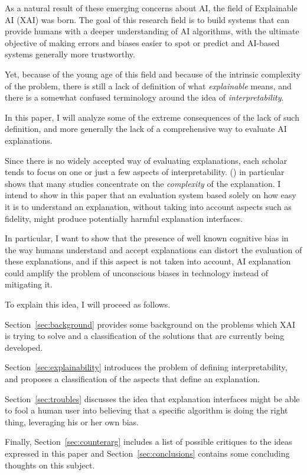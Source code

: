 \documentclass[conference]{IEEEtran}
\begin{document}
As a natural result of these emerging concerns about AI, the field of
Explainable AI (XAI) was born. The goal of this research field is to build
systems that can provide humans with a deeper understanding of AI algorithms,
with the ultimate objective of making errors and biases easier to spot or
predict and AI-based systems generally more trustworthy.

Yet, because of the young age of this field and because of the intrinsic
complexity of the problem, there is still a lack of definition of what
\textit{explainable} means, and there is a somewhat confused terminology around
the idea of \textit{interpretability}.

In this paper, I will analyze some of the extreme consequences of the lack of
such definition, and more generally the lack of a comprehensive way to evaluate
AI explanations.

Since there is no widely accepted way of evaluating explanations, each
scholar tends to focus on one or just a few aspects of interpretability.
(\cite{Giannotti}) in particular shows that many studies concentrate on the
\textit{complexity} of the explanation. I intend to show in this paper that an
evaluation system based solely on how easy it is to understand an explanation,
without taking into account aspects such as fidelity, might produce potentially
harmful explanation interfaces.

In particular, I want to show that the presence of well known cognitive bias in
the way humans understand and accept explanations can distort the evaluation of
these explanations, and if this aspect is not taken into account, AI explanation
could amplify the problem of unconscious biases in technology instead of
mitigating it.

To explain this idea, I will proceed as follows.

Section~\ref{sec:background} provides some background on the problems
which XAI is trying to solve and a classification of the solutions that are
currently being developed.

Section~\ref{sec:explainability} introduces the problem of defining
interpretability, and proposes a classification of the aspects that define an
explanation.

Section~\ref{sec:troubles} discusses the idea that explanation
interfaces might be able to fool a human user into believing that a specific
algorithm is doing the right thing, leveraging his or her own bias.

Finally, Section~\ref{sec:counterarg} includes a list of possible critiques to
the ideas expressed in this paper and Section~\ref{sec:conclusions} contains
some concluding thoughts on this subject.
\end{document}
